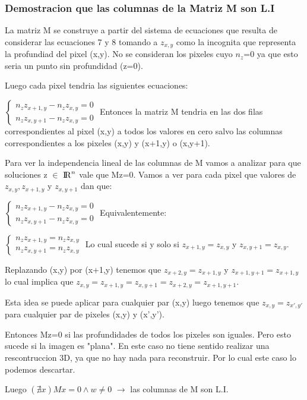 \subsubsection{Demostracion que las columnas de la Matriz M son L.I}
\indent La matriz M se construye a partir del sistema de ecuaciones que resulta de considerar las ecuaciones 7 y 8 tomando a $z_{x,y}$ como la incognita que representa la profundiad del pixel (x,y). No se consideran los pixeles cuyo $n_{z}$=0 ya que esto seria un punto sin profundidad (z=0). \par
\indent Luego cada pixel tendria las siguientes ecuaciones:\par
$\begin{cases}
n_{z} z_{x+1,y} - n_{z} z_{x,y}=0\\
n_{z} z_{x,y+1} - n_{z} z_{x,y}=0
\end{cases}$
\break
\indent Entonces la matriz M tendria en las dos filas correspondientes al pixel (x,y) a todos los valores en cero salvo las columnas correspondientes a los pixeles (x,y) y (x+1,y) o (x,y+1). \par
\indent Para ver la independencia lineal de las columnas de M vamos a analizar para que soluciones z $\in$ ${\rm I\!R}^{n}$ vale que Mz=0. Vamos a ver para cada pixel que valores de $z_{x,y} , z_{x+1,y}$  y $z_{x,y+1}$ dan que: \par
$\begin{cases}
n_{z} z_{x+1,y} - n_{z} z_{x,y}=0\\
n_{z} z_{x,y+1} - n_{z} z_{x,y}=0
\end{cases}$
\break
Equivalentemente:\par
$\begin{cases}
n_{z} z_{x+1,y} = n_{z} z_{x,y}\\
n_{z} z_{x,y+1} = n_{z} z_{x,y}
\end{cases}$
\break
\indent Lo cual sucede si y solo si $z_{x+1,y} = z_{x,y}$ y $z_{x,y+1} = z_{x,y}$. \par
Replazando (x,y) por (x+1,y) tenemos que $z_{x+2,y} = z_{x+1,y}$ y $z_{x+1,y+1} = z_{x+1,y}$ lo cual implica que $z_{x,y}=z_{x+1,y} =z_{x,y+1}= z_{x+2,y} = z_{x+1,y+1}$.\par
Esta idea se puede aplicar para cualquier par (x,y) luego tenemos que $z_{x,y} = z_{x',y'}$ para cualquier par de pixeles (x,y) y (x',y').\par
\indent Entonces  Mz=0 si las profundidades de todos los pixeles son iguales. Pero esto sucede si la imagen es "plana". En este caso no tiene sentido realizar una rescontruccion 3D, ya que no hay nada para reconstruir. Por lo cual este caso lo podemos descartar.\par
\indent Luego  $(\nexists x ) Mx = 0 \land w \neq 0 $ $\rightarrow$ las columnas de M son L.I.


